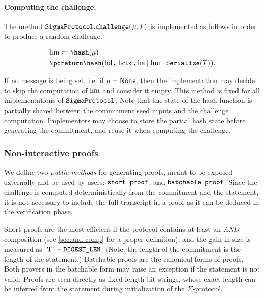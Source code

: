 \documentclass[11pt]{article}
\begin{document}
\paragraph{Computing the challenge.}
The method $\texttt{SigmaProtocol}.\texttt{challenge}(\mu, T)$ is implemented as follows in order to produce a random challenge.

  \[
    \begin{aligned}
     & \hmsg \defeq \hash(\msg) \\
    & \pcreturn  \hash(\hd \concat \hctx \concat \hstatement \concatblock \hmsg \concatblock  \serialize(\commitment)).
    \end{aligned}
  \]

If no message is being set, i.e. if $\mu = \mathsf{None}$, then the implementation may decide to skip the computation of $\text{hm}$ and consider it empty.
This method is fixed for all implementations of $\texttt{SigmaProtocol}$. Note that the state of the hash function is partially shared between the commitment seed inputs and the challenge computation. Implementors may choose to store the partial hash state before generating the commitment, and reuse it when computing the challenge.






\subsubsection{Non-interactive proofs}

We define two \emph{public methods} for generating proofs, meant to be exposed externally and be used by users: $\texttt{short\_proof}$, and $\texttt{batchable\_proof}$.
Since the challenge is computed deterministically from the commitment and the statement, it is not necessary to include the full transcript in a proof as it can be deduced in the verification phase.

Short proofs are the most efficient if the protocol contains at least an \emph{AND} composition (see \cref{sec:and-comp} for a proper definition), and the gain in size is measured as $|\mathbf {T}| - \texttt{DIGEST\_LEN}$.
(Note: the length of the commitment is the length of the statement.)
Batchable proofs are the canonical forms of proofs.
Both provers in the batchable form may raise an exception if the statement is not valid.
Proofs are seen directly as fixed-length bit strings, whose exact length can be inferred from the statement during initialization of the $\Sigma$-protocol.
\end{document}
